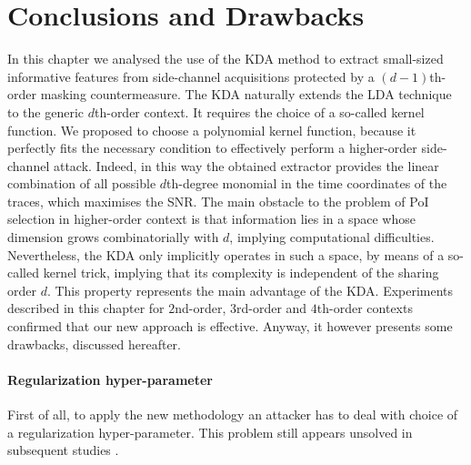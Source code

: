 \section{Conclusions and Drawbacks}\label{sec:KDAdrawbacks}
In this chapter we analysed the use of the KDA method to extract small-sized informative features from side-channel acquisitions protected by a $(d-1)$th-order masking countermeasure. The KDA naturally extends  the LDA technique to the generic $d$th-order context. It requires the choice of a so-called kernel function. We proposed to choose a polynomial kernel function, because it perfectly fits the necessary condition to effectively perform a  higher-order side-channel attack. Indeed, in this way the obtained extractor  provides the linear combination of all possible $d$th-degree monomial in the time coordinates of the traces, which maximises the SNR.  The main obstacle to the problem of PoI selection in higher-order context is that information lies in a space whose dimension grows combinatorially with $d$, implying computational difficulties. Nevertheless, the KDA only implicitly operates in such a space, by means of a so-called kernel trick, implying that its complexity is independent of the sharing order $d$. This property represents the main advantage of the KDA. Experiments described in this chapter for $2$nd-order, $3$rd-order and $4$th-order contexts confirmed that our new approach is effective. Anyway, it however presents some drawbacks, discussed hereafter. 

\paragraph*{Regularization hyper-parameter} First of all, to apply the new methodology an attacker has to deal with choice of a regularization hyper-parameter. This problem still appears unsolved in subsequent studies \cite{zhou2017novel}. 
